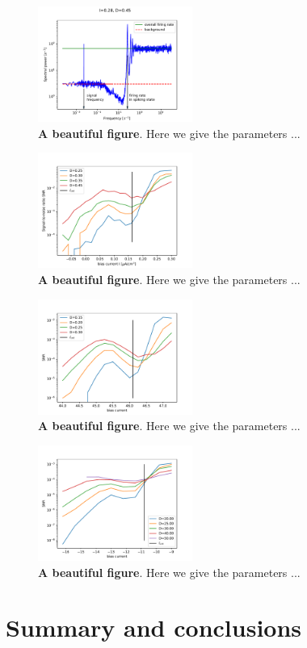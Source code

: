 \documentclass[twocolumn,showpacs,aps,superscriptaddress]{revtex4-1}
\begin{document}
\begin{figure}[h]
	\centering
	\includegraphics[width=0.45\textwidth]{FIGURES/specpaper2.pdf}
	\caption{{\bf A beautiful figure}. Here we give the parameters ...
	}
	\label{spectrumhighcurrent}
\end{figure}
\begin{figure}[h]
	\centering
	\includegraphics[width=0.45\textwidth]{FIGURES/snrsaddlenodecrit.pdf}
	\caption{{\bf A beautiful figure}. Here we give the parameters ...
	}
	\label{snrsaddlenode}
\end{figure}
\begin{figure}[h]
	\centering
	\includegraphics[width=0.45\textwidth]{FIGURES/snranhopfcrit.pdf}
	\caption{{\bf A beautiful figure}. Here we give the parameters ...
	}
	\label{snranhopf}
\end{figure}
\begin{figure}[h]
	\centering
	\includegraphics[width=0.45\textwidth]{FIGURES/snrinzelcrit.pdf}
	\caption{{\bf A beautiful figure}. Here we give the parameters ...
	}
	\label{snrrinzel}
\end{figure}
\section{Summary and conclusions}



\end{document}
